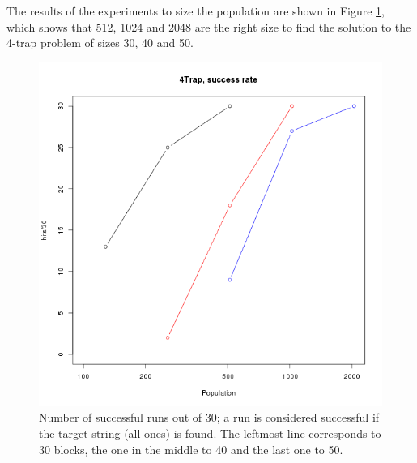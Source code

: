 \documentclass{sig-alternate}
\begin{document}
The results of the experiments to size the population are shown in
Figure \ref{fig:pop}, which shows that 512, 1024 and 2048 are the
right size to find the solution to the 4-trap problem of sizes 30, 40
and 50. 

\begin{figure}[htb]
\centering
   \includegraphics[scale=0.4]{base-hits-pop.png}
\caption{Number of successful runs out of 30; a run is considered
  successful if the target string (all ones) is found. The leftmost
  line corresponds to 30 blocks, the one in the middle to 40 and the
  last one to 50. }
\label{fig:pop}
\end{figure}
%
\end{document}
